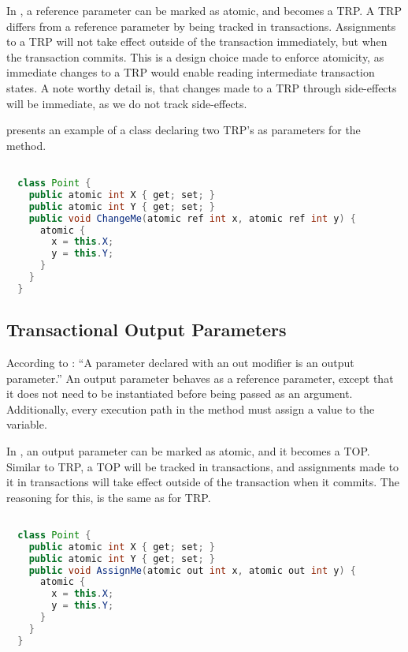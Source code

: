 In \stmnamesp, a reference parameter can be marked as atomic, and becomes a \ac{TRP}. A \ac{TRP} differs from a reference parameter by being tracked in transactions. Assignments to a \ac{TRP} will not take effect outside of the transaction immediately, but when the transaction commits. This is a design choice made to enforce atomicity, as immediate changes to a \ac{TRP} would enable reading intermediate transaction states. A note worthy detail is, that changes made to a \ac{TRP} through side-effects will be immediate, as we do not track side-effects.

 presents an example of a  class declaring two \ac{TRP}'s as parameters for the  method.

\begin{lstlisting}[label=lst:atomic_ref,
  caption={Transactional Reference Parameter},
  language=Java,  
  showspaces=false,
  showtabs=false,
  breaklines=true,
  showstringspaces=false,
  breakatwhitespace=true,
  commentstyle=\color{greencomments},
  keywordstyle=\color{bluekeywords},
  stringstyle=\color{redstrings},
  morekeywords={atomic, retry, orElse, var, get, set}]  % Start your code-block

  class Point {
    public atomic int X { get; set; }
    public atomic int Y { get; set; }
    public void ChangeMe(atomic ref int x, atomic ref int y) {
      atomic { 
        x = this.X;
        y = this.Y;
      }
    }    
  }
\end{lstlisting}

\subsection{Transactional Output Parameters}
According to \cite[p. 97]{csharp2013specificaiton}: ``A parameter declared with an out modifier is an output parameter.'' An output parameter behaves as a reference parameter, except that it does not need to be instantiated before being passed as an argument. Additionally, every execution path in the method must assign a value to the variable\cite[p. 42]{sestoft2011c}. 

In \stmname, an output parameter can be marked as atomic, and it becomes a \ac{TOP}. Similar to \ac{TRP}, a \ac{TOP} will be tracked in transactions, and assignments made to it in transactions will take effect outside of the transaction when it commits. The reasoning for this, is the same as for \ac{TRP}.

\begin{lstlisting}[label=lst:atomic_out,
  caption={Transactional Output Parameter},
  language=Java,  
  showspaces=false,
  showtabs=false,
  breaklines=true,
  showstringspaces=false,
  breakatwhitespace=true,
  commentstyle=\color{greencomments},
  keywordstyle=\color{bluekeywords},
  stringstyle=\color{redstrings},
  morekeywords={atomic, retry, orElse, var, get, set}]  % Start your code-block

  class Point {
    public atomic int X { get; set; }
    public atomic int Y { get; set; }
    public void AssignMe(atomic out int x, atomic out int y) {
      atomic { 
        x = this.X;
        y = this.Y;
      }
    }    
  }
\end{lstlisting}

